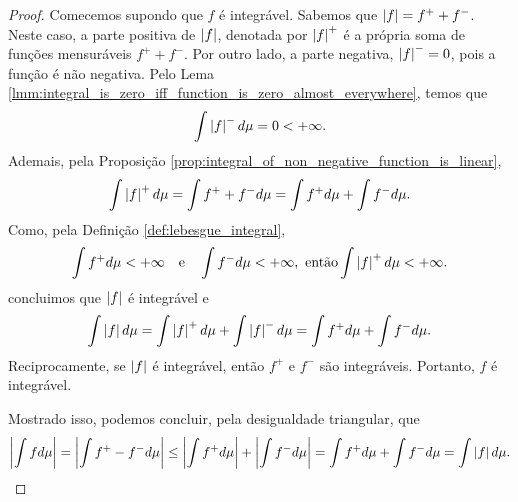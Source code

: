 \begin{proof}
    Comecemos supondo que $f$ é integrável. Sabemos que $\left| f \right|=f^{+}+f^{-}$. Neste caso, a parte positiva de $\left| f \right|$, denotada por $\left| f \right|^{+}$ é a própria soma de funções mensuráveis $f^{+}+f^{-}$. Por outro lado, a parte negativa, $\left| f \right|^{-}=0$, pois a função é não negativa. Pelo Lema \ref{lmm:integral_is_zero_iff_function_is_zero_almost_everywhere}, temos que 
    \begin{equation*}
        \int \left| f \right|^{-} d\mu = 0 < +\infty.
    \end{equation*}
    Ademais, pela Proposição \ref{prop:integral_of_non_negative_function_is_linear},
    \begin{equation*}
        \int \left| f \right|^{+} d\mu = \int f^{+}+f^{-} d\mu = \int f^{+} d\mu + \int f^{-} d\mu.
    \end{equation*}
    Como, pela Definição \ref{def:lebesgue_integral},
    \begin{equation*}
        \int f^{+} d\mu <+\infty \quad \text{e}\quad  \int f^{-} d\mu < +\infty, \text{ então} \int \left| f \right|^{+} d\mu < +\infty.
    \end{equation*}
    concluimos que $\left| f \right|$ é integrável e
    \begin{equation*}
        \int \left| f \right| d\mu = \int \left| f \right|^{+} d\mu + \int \left| f \right|^{-} d\mu = \int f^{+} d\mu + \int f^{-} d\mu.
    \end{equation*}
    Reciprocamente, se $\left| f \right|$ é integrável, então $f^{+}$ e $f^{-}$ são integráveis. Portanto, $f$ é integrável.

    Mostrado isso, podemos concluir, pela desigualdade triangular, que
    \begin{equation*}
        \left| \int f d\mu \right| = \left| \int f^{+} - f^{-} d\mu \right| \leq \left| \int f^{+} d\mu \right| + \left| \int f^{-} d\mu \right| = \int f^{+} d\mu + \int f^{-} d\mu = \int \left| f \right| d\mu.
    \end{equation*}
\end{proof}
